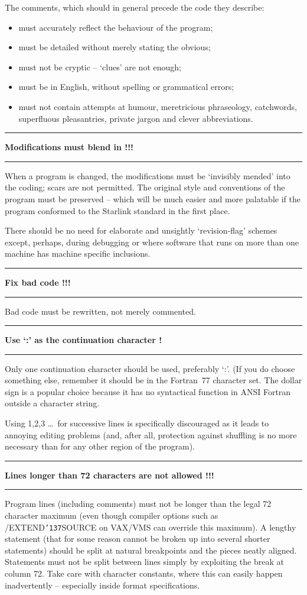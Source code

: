 \documentclass[twoside,11pt,nolof,noabs]{starlink}
\newcounter{sruleno}
\providecommand{\srule}[1]{
    \addtocounter{sruleno}{1}
    \goodbreak
    \rule{\textwidth}{0.3mm}
    \textbf{#1} \scpushright{ \textbf{\thesruleno}}
    \rule{\textwidth}{0.1mm}
}
\renewcommand{\_}{{\tt\char'137}}
\begin{document}
The comments, which should in general precede the code they
describe:
\begin{itemize}
\item must accurately reflect the behaviour of the program;
\item must be detailed without merely stating the obvious;
\item must not be cryptic -- `clues' are not enough;
\item must be in English, without spelling or grammatical errors;
\item must not contain attempts at humour, meretricious
phraseology, catchwords, superfluous pleasantries, private jargon
and clever abbreviations.
\end{itemize}

\srule{Modifications must blend in !!!}
When a program is changed, the modifications must be `invisibly mended' into the
coding;
scars are not permitted.
The original style and conventions of the program must be
preserved -- which will
be much easier and more palatable if the program conformed to the Starlink
standard in the first place.

There should be no need for elaborate and unsightly `revision-flag' schemes
except, perhaps, during debugging or where software that runs on more than one
machine has machine specific inclusions.

\srule{Fix bad code !!!}
Bad code must be rewritten, not merely commented.

\srule{Use `:' as the continuation character !}
Only one continuation character should be used, preferably `:'.  (If
you do choose something else, remember
it should be in the Fortran~77 character set. The dollar sign is
a popular choice because it has no syntactical function in ANSI Fortran
outside a character string.

Using 1,2,3 \ldots\ for successive lines is specifically discouraged as it leads
to annoying editing problems (and, after all, protection against shuffling is no
more necessary than for any other region of the program).

\srule{Lines longer than 72 characters are not allowed !!!}
Program lines (including comments)
must not be longer than the legal 72 character maximum (even though
compiler options such as /EXTEND\_SOURCE on VAX/VMS can override this
maximum).
A lengthy statement (that for some reason cannot be broken up into several
shorter statements) should be split at natural breakpoints and the pieces
neatly aligned.
Statements must not be split between lines simply by exploiting the break at
column 72.  Take care with character constants, where this can easily
happen inadvertently -- especially inside format specifications.
\end{document}

